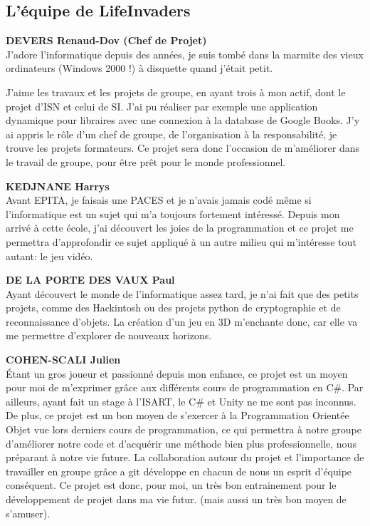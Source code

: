 \documentclass[french, 12pt]{article}
\begin{document}
\subsection{L'équipe de LifeInvaders}
\textbf{DEVERS Renaud-Dov (Chef de Projet)} \\
J'adore l'informatique depuis des années, je suis tombé dans la marmite des vieux ordinateurs (Windows 2000 !) à disquette quand j'était petit.

J'aime les travaux et les projets de groupe, en ayant trois à mon actif, dont le projet d'ISN et celui de SI. J'ai pu réaliser par exemple une application dynamique pour libraires avec une connexion à la database de Google Books.
J'y ai appris le rôle d'un chef de groupe, de l'organisation à la responsabilité, je trouve les projets formateurs.
Ce projet sera donc l'occasion de m'améliorer dans le travail de groupe, pour être prêt pour le monde professionnel.
\newline

\textbf{KEDJNANE Harrys} \\
Avant EPITA, je faisais une PACES et je n’avais jamais codé même si l’informatique est un sujet qui m’a toujours fortement intéressé. Depuis mon arrivé à cette école, j’ai découvert les joies de la programmation et ce projet me permettra d’approfondir ce sujet appliqué à un autre milieu qui m’intéresse tout autant: le jeu vidéo. 
\newline

\textbf{DE LA PORTE DES VAUX Paul} \\
Ayant découvert le monde de l’informatique assez tard, je n’ai fait que des petits projets, comme des Hackintosh ou des projets python de cryptographie et de reconnaissance d’objets.
La création d’un jeu en 3D m’enchante donc, car elle va me permettre d’explorer de nouveaux horizons.
\newline

\textbf{COHEN-SCALI Julien} \\
Étant un gros joueur et passionné depuis mon enfance, ce projet est un moyen pour moi de m’exprimer grâce aux différents cours de programmation en C\#.
Par ailleurs, ayant fait un stage à l’ISART, le C\# et Unity ne me sont pas inconnus. De plus, ce projet est un bon moyen de s’exercer à la Programmation Orientée Objet vue lors derniers cours de programmation,
ce qui permettra à notre groupe d’améliorer notre code et d’acquérir une méthode bien plus professionnelle, nous préparant à notre vie future.
La collaboration autour du projet et l’importance de travailler en groupe grâce a git développe en chacun de nous un esprit d’équipe conséquent.
Ce projet est donc, pour moi, un très bon entrainement pour le développement de projet dans ma vie futur. (mais aussi un très bon moyen de s’amuser).
\end{document}
